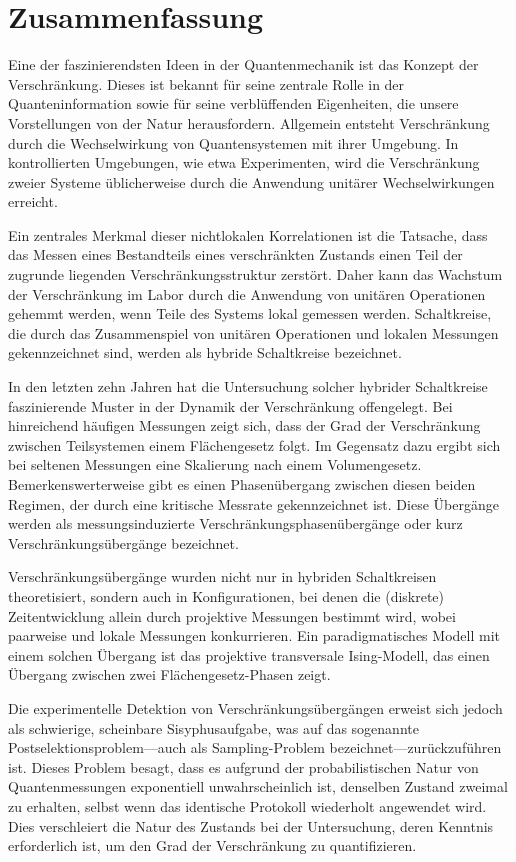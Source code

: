 \chapter{Zusammenfassung}
Eine der faszinierendsten Ideen in der Quantenmechanik ist das Konzept der
Verschränkung. Dieses ist bekannt für seine zentrale Rolle in der
Quanteninformation sowie für seine verblüffenden
Eigenheiten, die unsere Vorstellungen von der Natur herausfordern. Allgemein
entsteht Verschränkung durch die Wechselwirkung von Quantensystemen mit ihrer
Umgebung. In kontrollierten Umgebungen, wie etwa Experimenten, wird die
Verschränkung zweier Systeme üblicherweise durch die Anwendung unitärer
Wechselwirkungen erreicht.

Ein zentrales Merkmal dieser nichtlokalen Korrelationen ist die Tatsache, dass
das Messen eines Bestandteils eines verschränkten Zustands einen Teil der
zugrunde liegenden Verschränkungsstruktur zerstört. Daher kann das Wachstum der
Verschränkung im Labor durch die Anwendung von unitären Operationen gehemmt
werden, wenn Teile des Systems lokal gemessen werden. Schaltkreise, die durch
das Zusammenspiel von unitären Operationen und lokalen Messungen gekennzeichnet
sind, werden als hybride Schaltkreise bezeichnet.

In den letzten zehn Jahren hat die Untersuchung solcher hybrider Schaltkreise
faszinierende Muster in der Dynamik der Verschränkung offengelegt. Bei
hinreichend häufigen Messungen zeigt sich, dass der Grad der Verschränkung
zwischen Teilsystemen einem Flächengesetz folgt. Im Gegensatz dazu ergibt sich
bei seltenen Messungen eine Skalierung nach einem Volumengesetz.
Bemerkenswerterweise gibt es einen Phasenübergang zwischen diesen beiden
Regimen, der durch eine kritische Messrate gekennzeichnet ist. Diese Übergänge
werden als messungsinduzierte Verschränkungsphasenübergänge oder kurz
Verschränkungsübergänge bezeichnet.

Verschränkungsübergänge wurden nicht nur in hybriden Schaltkreisen
theoretisiert, sondern auch in Konfigurationen, bei denen die (diskrete)
Zeitentwicklung allein durch projektive Messungen bestimmt wird, wobei
paarweise und lokale Messungen konkurrieren. Ein paradigmatisches Modell mit
einem solchen Übergang ist das projektive transversale Ising-Modell, das einen
Übergang zwischen zwei Flächengesetz-Phasen zeigt.

Die experimentelle Detektion von Verschränkungsübergängen erweist sich jedoch
als schwierige, scheinbare Sisyphusaufgabe, was auf das sogenannte
Postselektionsproblem---auch als Sampling-Problem bezeichnet---zurückzuführen ist.
Dieses Problem besagt, dass es aufgrund der probabilistischen Natur von
Quantenmessungen exponentiell unwahrscheinlich ist, denselben Zustand zweimal
zu erhalten, selbst wenn das identische Protokoll wiederholt angewendet wird.
Dies verschleiert die Natur des Zustands bei der Untersuchung, deren Kenntnis
erforderlich ist, um den Grad der Verschränkung zu quantifizieren.

